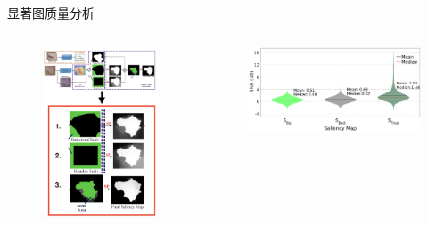 \begin{frame}{显著图质量分析}
\begin{columns}[c]
\begin{figure}
    \centering
    \includegraphics[width=\linewidth]{figures/slaiencyquality.png}
\end{figure}

\begin{figure}
    \centering
    \includegraphics[width=\linewidth]{figures/VitViolin.eps}
\end{figure}


\end{columns}
\end{frame}
